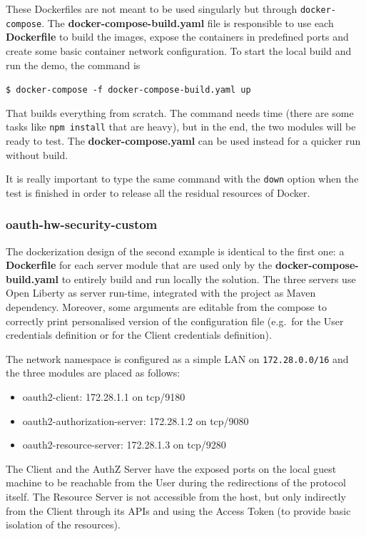 \documentclass[a4paper,12pt]{article}
\def\eg{e.g.\xspace}
\begin{document}
These Dockerfiles are not meant to be used singularly but through \texttt{docker-compose}. The \textbf{docker-compose-build.yaml} file is responsible to use each \textbf{Dockerfile} to build the images, expose the containers in predefined ports and create some basic container network configuration. To start the local build and run the demo, the command is

\quad \texttt{\$ docker-compose -f docker-compose-build.yaml up}

That builds everything from scratch. The command needs time (there are some tasks like \texttt{npm install} that are heavy), but in the end, the two modules will be ready to test. The \textbf{docker-compose.yaml} can be used instead for a quicker run without build.

It is really important to type the same command with the \texttt{down} option when the test is finished in order to release all the residual resources of Docker.

\subsubsection{oauth-hw-security-custom}
The dockerization design of the second example is identical to the first one: a \textbf{Dockerfile} for each server module that are used only by the \textbf{docker-compose-build.yaml} to entirely build and run locally the solution. The three servers use Open Liberty as server run-time, integrated with the project as Maven dependency. Moreover, some arguments are editable from the compose to correctly print personalised version of the configuration file (\eg\ for the User credentials definition or for the Client credentials definition).

The network namespace is configured as a simple LAN on \texttt{172.28.0.0/16} and the three modules are placed as follows:

\begin{itemize}
    \item oauth2-client: 172.28.1.1 on tcp/9180
    \item oauth2-authorization-server: 172.28.1.2 on tcp/9080
    \item oauth2-resource-server: 172.28.1.3 on tcp/9280
\end{itemize}

The Client and the AuthZ Server have the exposed ports on the local guest machine to be reachable from the User during the redirections of the protocol itself. The Resource Server is not accessible from the host, but only indirectly from the Client through its APIs and using the Access Token (to provide basic isolation of the resources).
\label{docker}
\end{document}
